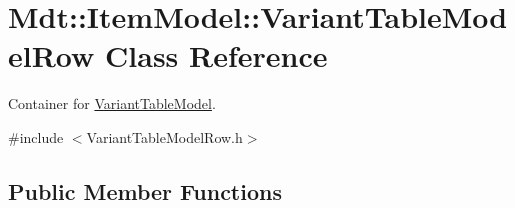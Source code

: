 \hypertarget{class_mdt_1_1_item_model_1_1_variant_table_model_row}{}\section{Mdt\+:\+:Item\+Model\+:\+:Variant\+Table\+Model\+Row Class Reference}
\label{class_mdt_1_1_item_model_1_1_variant_table_model_row}


Container for \hyperlink{class_mdt_1_1_item_model_1_1_variant_table_model}{Variant\+Table\+Model}.  




{\ttfamily \#include $<$Variant\+Table\+Model\+Row.\+h$>$}

\subsection*{Public Member Functions}
